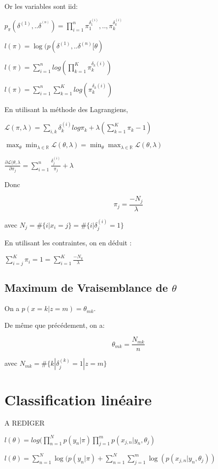 \documentclass{article}
\begin{document}
Or les variables sont iid:

$p_\pi(\delta^{(1)}, .. \delta^{^(n)}) = \prod_{i=1}^n \pi_1^{\delta_1^{(i)}},
.., \pi_k^{\delta_k^{(i)}}$

$l(\pi) = \log(p(\delta^{(1)}, .. \delta^{(n)}[\theta)$

$l(\pi) = \sum_{i=1}^n log(\prod_{k=1}^K \pi_k^{\delta_k(i)})$

$l(\pi) = \sum_{i=1}^n \sum_{k=1}^K log(\pi_k^{\delta_k(i)})$

En utilisant la méthode des Lagrangiens,

$\mathcal{L}(\pi, \lambda) = \sum_{i, k} \delta_k^{(i)} log \pi_k +
\lambda(\sum_{k=1}^K \pi_k - 1)$

$\max_\theta \min_{\lambda \in \mathbb{R}} \mathcal{L}(\theta, \lambda) =
\min_\theta \max_{\lambda \in \mathbb{R}} \mathcal{L}(\theta, \lambda)$

$\frac{\partial \mathcal{L}(\theta, \lambda}{\partial \pi_j} = \sum_{i=1}^n
\frac{\delta_j^{(i)}}{\pi_j} + \lambda$

Donc

$$\pi_j = \frac{-N_j}{\lambda}$$

avec $N_j = \#\{ i | x_i = j \} = \#\{ i | \delta_j^{(i)} = 1 \}$

En utilisant les contraintes, on en déduit :

$\sum_{i=j}^K \pi_i = 1 = \sum_{i=1}^K \frac{- N_k}{\lambda}$

\subsection{Maximum de Vraisemblance de $\theta$}


On a $p(x=k|z=m)= \theta_{mk}$.

De même que précédement, on a:

$$\theta_{mk} = \frac{N_{mk}}{n}$$

avec $N_{mk} = \#\{k|\delta_j^{(k)} = 1 | z = m\}$

\section{Classification linéaire}

A REDIGER

$l(\theta) = log(\prod_{n=1}^N p (y_n | \pi) \prod_{j=1}^m p(x_{j, n}|y_n, \theta_j)$

$l(\theta) = \sum_{n=1}^N \log(p(y_n |\pi) + \sum_{n=1}^{N}\sum_{j=1}^m \log(p(x_{j, n}|y_n, \theta_j))$
\end{document}
